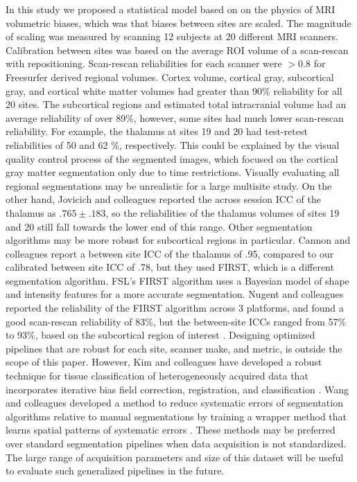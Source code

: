 In this study we proposed a statistical model based on on the physics of MRI volumetric biases, which was that biases between sites are scaled. The magnitude of scaling was measured by scanning 12 subjects at 20 different MRI scanners. Calibration between sites was based on the average ROI volume of a scan-rescan with repositioning. Scan-rescan reliabilities for each scanner were $>0.8$ for Freesurfer derived regional volumes. Cortex volume, cortical gray, subcortical gray, and cortical white matter volumes had greater than 90\% reliability for all 20 sites. The subcortical regions and estimated total intracranial volume had an average reliability of over 89\%, however, some sites had much lower scan-rescan reliability. For example, the thalamus at sites 19 and 20 had test-retest reliabilities of 50 and 62 \%, respectively. This could be explained by the visual quality control process of the segmented images, which focused on the cortical gray matter segmentation only due to time restrictions. Visually evaluating all regional segmentations may be unrealistic for a large multisite study. On the other hand, Jovicich and colleagues \cite{jovicich2013brain} reported the across session ICC of the thalamus as $.765 \pm .183$, so the reliabilities of the thalamus volumes of sites 19 and 20 still fall towards the lower end of this range. Other segmentation algorithms may be more robust for subcortical regions in particular. Cannon and colleagues \cite{cannon2014} report a between site ICC of the thalamus of .95, compared to our calibrated between site ICC of .78, but they used FIRST, which is a different segmentation algorithm. FSL's FIRST algorithm \cite{firstcitation} uses a Bayesian model of shape and intensity features for a more accurate segmentation. Nugent and colleagues reported the reliability of the FIRST algorithm across 3 platforms, and found a good scan-rescan reliability of 83\%, but the between-site ICCs ranged from 57\% to 93\%, based on the subcortical region of interest \cite{firstreliability}. Designing optimized pipelines that are robust for each site, scanner make, and metric, is outside the scope of this paper. However, Kim and colleagues have developed a robust technique for tissue classification of heterogeneously acquired data that incorporates iterative bias field correction, registration, and classification \cite{optimize}. Wang and colleagues developed a method to reduce systematic errors of segmentation algorithms relative to manual segmentations by training a wrapper method that learns spatial patterns of systematic errors \cite{Wang2011}. These methods may be preferred over standard segmentation pipelines when data acquisition is not standardized. The large range of acquisition parameters and size of this dataset will be useful to evaluate such generalized pipelines in the future.